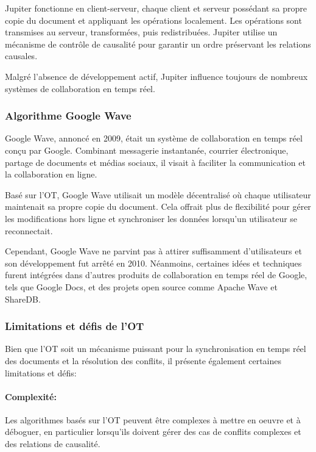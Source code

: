 Jupiter fonctionne en client-serveur, chaque client et serveur possédant sa propre copie du document et appliquant les opérations localement. Les opérations sont transmises au serveur, transformées, puis redistribuées. Jupiter utilise un mécanisme de contrôle de causalité pour garantir un ordre préservant les relations causales.

Malgré l'absence de développement actif, Jupiter influence toujours de nombreux systèmes de collaboration en temps réel.

\subsubsection{Algorithme Google Wave}
Google Wave\cite{incIntroducingGoogleWave2009}, annoncé en 2009, était un système de collaboration en temps réel conçu par Google. Combinant messagerie instantanée, courrier électronique, partage de documents et médias sociaux, il visait à faciliter la communication et la collaboration en ligne.

Basé sur l'OT, Google Wave utilisait un modèle décentralisé où chaque utilisateur maintenait sa propre copie du document. Cela offrait plus de flexibilité pour gérer les modifications hors ligne et synchroniser les données lorsqu'un utilisateur se reconnectait.

Cependant, Google Wave ne parvint pas à attirer suffisamment d'utilisateurs et son développement fut arrêté en 2010\cite{holzleUpdateGoogleWave2010}. Néanmoins, certaines idées et techniques furent intégrées dans d'autres produits de collaboration en temps réel de Google, tels que Google Docs, et des projets open source comme Apache Wave\cite{foundationApacheWave2012} et ShareDB\cite{smithShareDBRealtimeDocument2014}.

\subsubsection{Limitations et défis de l'OT}
Bien que l'OT soit un mécanisme puissant pour la synchronisation en temps réel des documents et la résolution des conflits, il présente également certaines limitations et défis:

\paragraph{Complexité:} Les algorithmes basés sur l'OT peuvent être complexes à mettre en oeuvre et à déboguer, en particulier lorsqu'ils doivent gérer des cas de conflits complexes et des relations de causalité.
